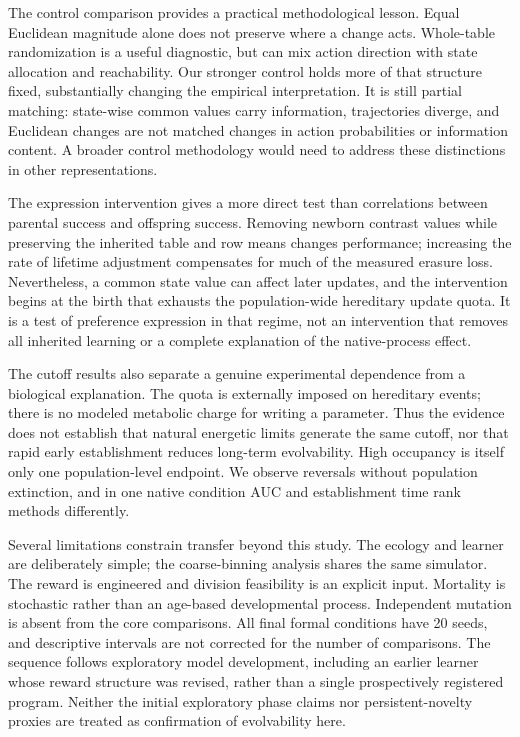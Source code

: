 \documentclass[11pt]{article}
\begin{document}
The control comparison provides a practical methodological lesson. Equal Euclidean magnitude alone does not preserve where a change acts. Whole-table randomization is a useful diagnostic, but can mix action direction with state allocation and reachability. Our stronger control holds more of that structure fixed, substantially changing the empirical interpretation. It is still partial matching: state-wise common values carry information, trajectories diverge, and Euclidean changes are not matched changes in action probabilities or information content. A broader control methodology would need to address these distinctions in other representations.

The expression intervention gives a more direct test than correlations between parental success and offspring success. Removing newborn contrast values while preserving the inherited table and row means changes performance; increasing the rate of lifetime adjustment compensates for much of the measured erasure loss. Nevertheless, a common state value can affect later updates, and the intervention begins at the birth that exhausts the population-wide hereditary update quota. It is a test of preference expression in that regime, not an intervention that removes all inherited learning or a complete explanation of the native-process effect.

The cutoff results also separate a genuine experimental dependence from a biological explanation. The quota is externally imposed on hereditary events; there is no modeled metabolic charge for writing a parameter. Thus the evidence does not establish that natural energetic limits generate the same cutoff, nor that rapid early establishment reduces long-term evolvability. High occupancy is itself only one population-level endpoint. We observe reversals without population extinction, and in one native condition AUC and establishment time rank methods differently.

Several limitations constrain transfer beyond this study. The ecology and learner are deliberately simple; the coarse-binning analysis shares the same simulator. The reward is engineered and division feasibility is an explicit input. Mortality is stochastic rather than an age-based developmental process. Independent mutation is absent from the core comparisons. All final formal conditions have 20 seeds, and descriptive intervals are not corrected for the number of comparisons. The sequence follows exploratory model development, including an earlier learner whose reward structure was revised, rather than a single prospectively registered program. Neither the initial exploratory phase claims nor persistent-novelty proxies are treated as confirmation of evolvability here.
\end{document}
